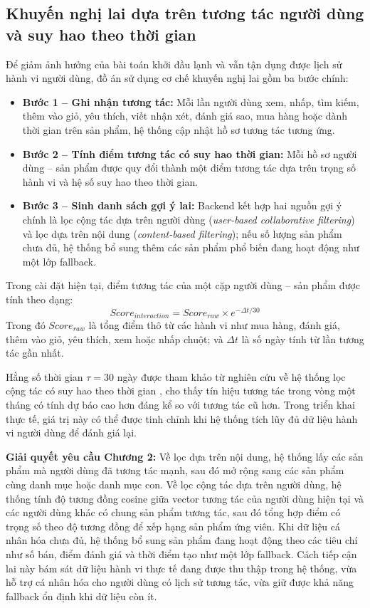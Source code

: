 \documentclass[../DoAn.tex]{subfiles}
\begin{document}
\subsection{Khuyến nghị lai dựa trên tương tác người dùng và suy hao theo thời gian}
Để giảm ảnh hưởng của bài toán khởi đầu lạnh và vẫn tận dụng được lịch sử hành vi người dùng, đồ án sử dụng cơ chế khuyến nghị lai gồm ba bước chính:
\begin{itemize}
    \item \textbf{Bước 1 -- Ghi nhận tương tác:} Mỗi lần người dùng xem, nhấp, tìm kiếm, thêm vào giỏ, yêu thích, viết nhận xét, đánh giá sao, mua hàng hoặc dành thời gian trên sản phẩm, hệ thống cập nhật hồ sơ tương tác tương ứng.
    \item \textbf{Bước 2 -- Tính điểm tương tác có suy hao thời gian:} Mỗi hồ sơ người dùng -- sản phẩm được quy đổi thành một điểm tương tác dựa trên trọng số hành vi và hệ số suy hao theo thời gian.
    \item \textbf{Bước 3 -- Sinh danh sách gợi ý lai:} Backend kết hợp hai nguồn gợi ý chính là lọc cộng tác dựa trên người dùng (\textit{user-based collaborative filtering}) và lọc dựa trên nội dung (\textit{content-based filtering}); nếu số lượng sản phẩm chưa đủ, hệ thống bổ sung thêm các sản phẩm phổ biến đang hoạt động như một lớp fallback.
\end{itemize}

Trong cài đặt hiện tại, điểm tương tác của một cặp người dùng -- sản phẩm được tính theo dạng:
\begin{equation}
    Score_{interaction} = Score_{raw} \times e^{- \Delta t / 30}
\end{equation}
Trong đó $Score_{raw}$ là tổng điểm thô từ các hành vi như mua hàng, đánh giá, thêm vào giỏ, yêu thích, xem hoặc nhấp chuột; và $\Delta t$ là số ngày tính từ lần tương tác gần nhất.

Hằng số thời gian $\tau = 30$ ngày được tham khảo từ nghiên cứu về hệ thống lọc cộng tác có suy hao theo thời gian \cite{time-decay-cf}, cho thấy tín hiệu tương tác trong vòng một tháng có tính dự báo cao hơn đáng kể so với tương tác cũ hơn. Trong triển khai thực tế, giá trị này có thể được tinh chỉnh khi hệ thống tích lũy đủ dữ liệu hành vi người dùng để đánh giá lại.

\textbf{Giải quyết yêu cầu Chương 2:}
Về lọc dựa trên nội dung, hệ thống lấy các sản phẩm mà người dùng đã tương tác mạnh, sau đó mở rộng sang các sản phẩm cùng danh mục hoặc danh mục con. Về lọc cộng tác dựa trên người dùng, hệ thống tính độ tương đồng cosine giữa vector tương tác của người dùng hiện tại và các người dùng khác có chung sản phẩm tương tác, sau đó tổng hợp điểm có trọng số theo độ tương đồng để xếp hạng sản phẩm ứng viên. Khi dữ liệu cá nhân hóa chưa đủ, hệ thống bổ sung sản phẩm đang hoạt động theo các tiêu chí như số bán, điểm đánh giá và thời điểm tạo như một lớp fallback. Cách tiếp cận lai này bám sát dữ liệu hành vi thực tế đang được thu thập trong hệ thống, vừa hỗ trợ cá nhân hóa cho người dùng có lịch sử tương tác, vừa giữ được khả năng fallback ổn định khi dữ liệu còn ít.
\end{document}

